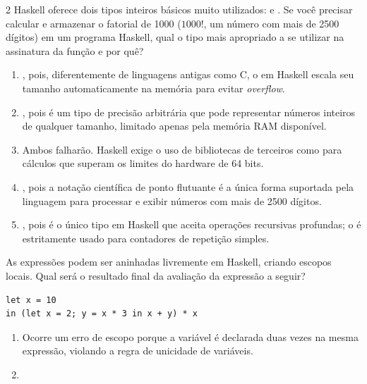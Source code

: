 \documentclass[a4paper,10pt,brazil]{article}
\begin{document}
\begin{multicols}{2}
Haskell oferece dois tipos inteiros básicos muito utilizados:  e . Se você precisar calcular e armazenar o fatorial de 1000 ($1000!$, um número com mais de 2500 dígitos) em um programa Haskell, qual o tipo mais apropriado a se utilizar na assinatura da função e por quê?

\begin{enumerate}
  \item {}, pois, diferentemente de linguagens antigas como C, o  em Haskell escala seu tamanho automaticamente na memória para evitar \emph{overflow}.

  \item {}, pois é um tipo de precisão arbitrária que pode representar números inteiros de qualquer tamanho, limitado apenas pela memória RAM disponível.

  \item Ambos falharão. Haskell exige o uso de bibliotecas de terceiros como  para cálculos que superam os limites do hardware de 64 bits.

  \item {}, pois a notação científica de ponto flutuante é a única forma suportada pela linguagem para processar e exibir números com mais de 2500 dígitos.

  \item {}, pois é o único tipo em Haskell que aceita operações recursivas profundas; o  é estritamente usado para contadores de repetição simples.


\end{enumerate}

As expressões  podem ser aninhadas livremente em Haskell, criando escopos locais. Qual será o resultado final da avaliação da expressão a seguir?
\begin{verbatim}
let x = 10 
in (let x = 2; y = x * 3 in x + y) * x
\end{verbatim}

\begin{enumerate}
  \item Ocorre um erro de escopo porque a variável  é declarada duas vezes na mesma expressão, violando a regra de unicidade de variáveis.

  \item {}


\end{enumerate}
\end{multicols}
\end{document}
